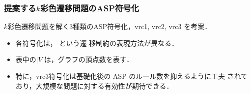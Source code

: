 \documentclass[dvipdfmx,11pt]{beamer}
\begin{document}

\begin{frame}\frametitle{提案する$k$彩色遷移問題のASP符号化}

  \begin{block}{}\centering
    $k$彩色遷移問題を解く3種類のASP符号化，vrc1, vrc2, vrc3 を考案．
  \end{block}

  \begin{itemize}
  \item 各符号化は，
    という遷
    移制約の表現方法が異なる．
  \item 表中の$|V|$は，グラフの頂点数を表す．
  \end{itemize}

  \begin{exampleblock}{}\centering
    
  \end{exampleblock}


  \begin{itemize}
  \item 特に，vrc3符号化は基礎化後の ASP のルール数を抑えるように工夫
    されており，大規模な問題に対する有効性が期待できる．
  \end{itemize}

\end{frame}

\begin{comment}
\begin{frame}\frametitle{ベンチマーク}

  \begin{itemize}
    \item 現時点で組合せ遷移問題は理論面の研究が主流であり, ベンチマークの整備が必要.
    \item 実験においてステップ$t$を与えるとき, その上限値が必要となる.
    \item ステップ$t$の上限値は, グラフ$G$を$k$彩色するときの実行可能解の数と等しい.
  \end{itemize}

  従って, 全解列挙が可能な($G, k$)からベンチマークを生成する必要がある.
  
\end{frame}
\end{comment}
\end{document}
